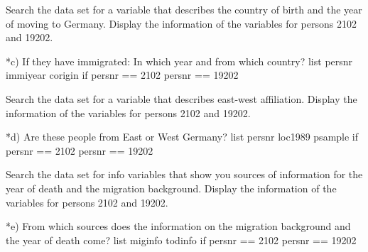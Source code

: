 \documentclass[letterpaper,10pt,openany,onesideH,english]{sphinxmanual}
\begin{document}

Search the data set for a variable that describes the country of birth and the year of moving to Germany. Display the information of the variables for persons 2102 and 19202.

%
\begin{sphinxVerbatim}[commandchars=\\\{\},numbers=left,firstnumber=1,stepnumber=1]
*c) If they have immigrated: In which year and from which country?
list persnr immiyear corigin if persnr  == 2102 \textbar{} persnr == 19202
\end{sphinxVerbatim}

\begin{figure}[H]
\centering

\noindent{}
\end{figure}


Search the data set for a variable that describes east-west affiliation.
Display the information of the variables for persons 2102 and 19202.

%
\begin{sphinxVerbatim}[commandchars=\\\{\},numbers=left,firstnumber=1,stepnumber=1]
*d) Are these people from East or West Germany?
list persnr loc1989 psample if persnr  == 2102 \textbar{} persnr == 19202
\end{sphinxVerbatim}

\begin{figure}[H]
\centering

\noindent{}
\end{figure}


Search the data set for info variables that show you sources of information for the year of death and the migration background. Display the information of the variables for persons 2102 and 19202.

%
\begin{sphinxVerbatim}[commandchars=\\\{\},numbers=left,firstnumber=1,stepnumber=1]
*e) From which sources does the information on the migration background and the year of death come?
list miginfo todinfo if persnr  == 2102 \textbar{} persnr == 19202
\end{sphinxVerbatim}
\end{document}
